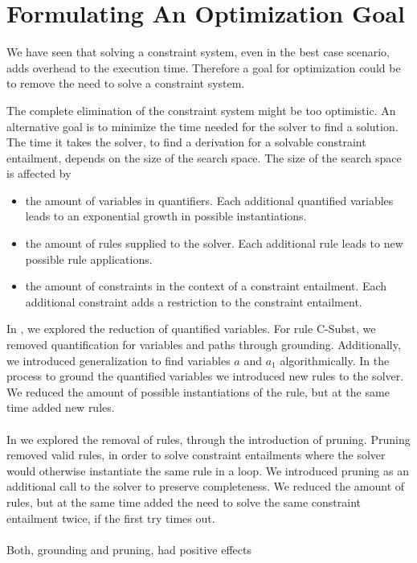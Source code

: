 \section{Formulating An Optimization Goal} %
\label{sec:goal}
We have seen that solving a constraint system,
even in the best case scenario,
adds overhead to the execution time.
Therefore a goal for optimization could be
to remove the need to solve a constraint system.

The complete elimination of the constraint system
might be too optimistic. An alternative goal
is to minimize the time needed for the solver to find a solution.
The time it takes the solver, to find a derivation for a solvable
constraint entailment, depends on the size of the search space.
The size of the search space is affected by
\begin{itemize}
  \item the amount of variables in quantifiers.
        Each additional quantified variables leads to an exponential growth in possible instantiations.
  \item the amount of rules supplied to the solver.
        Each additional rule leads to new possible rule applications.
  \item the amount of constraints in the context of a constraint entailment.
        Each additional constraint adds a restriction to the constraint entailment.
\end{itemize}
In ,
we explored the reduction of quantified variables.
For rule C-Subst, we removed quantification
for variables and paths through grounding.
Additionally, we introduced generalization
to find variables $a$ and $a_1$ algorithmically.
In the process to ground the quantified variables
we introduced new rules to the solver.
We reduced the amount of possible instantiations of the rule,
but at the same time added new rules.\\
\\
In  we explored the removal of rules,
through the introduction of pruning.
Pruning removed valid rules,
in order to solve constraint entailments
where the solver would otherwise
instantiate the same rule in a loop.
We introduced pruning
as an additional call to the solver
to preserve completeness.
We reduced the amount of rules,
but at the same time added
the need to solve the same constraint entailment twice,
if the first try times out.\\
\\
Both, grounding and pruning, had positive effects
